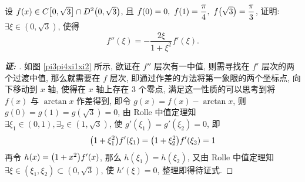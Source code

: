 \begin{example}
    设 $f(x)\in C\qty[0,\sqrt{3}]\cap D^2\qty(0,\sqrt{3})$, 且 $f(0)=0,~f(1)=\dfrac{\pi}{4},~f\qty(\sqrt{3})=\dfrac{\pi}{3}$, 证明: $\exists\xi\in(0,\sqrt{3})$, 使得 $$f''(\xi)=-\dfrac{2\xi}{1+\xi^2}f'(\xi).$$
\end{example}
\begin{proof}[{\songti \textbf{证: }}]
    如图 \ref{pi3pi4xi1xi2} 所示, 欲证在 $f''$ 层次有一中值, 则需寻找在 $f'$ 层次的两个过渡中值, 那么就需要在 $f$ 层次, 即通过作差的方法将第一象限的两个坐标点, 向下移动到 $x$ 轴, 使得在 $x$ 轴上存在 3 个零点, 
    满足这一性质的可以思考到将 $f(x)$ 与 $\arctan x$ 作差得到, 即令 $g(x)=f(x)-\arctan x$, 则 $g(0)=g(1)=g(\sqrt{3})=0$, 由 Rolle 中值定理知 $\exists\xi_1\in(0,1),\exists_2\in(1,\sqrt{3})$, 使 $g'(\xi_1)=g'(\xi_2)=0$, 即
    $$\qty(1+\xi_1^2)f'(\xi_1)=\qty(1+\xi_2^2)f'(\xi_2)=1$$
    再令 $h(x)=\qty(1+x^2)f'(x)$, 那么 $h(\xi_1)=h(\xi_2)$, 又由 Rolle 中值定理知 $\exists\xi\in(\xi_1,\xi_2)\subset(0,\sqrt{3})$, 使 $h'(\xi)=0$, 整理即得待证式.
\end{proof}

